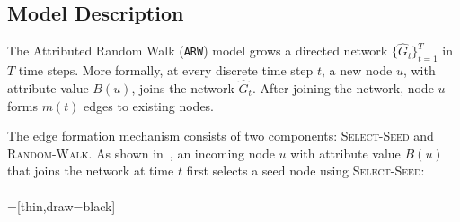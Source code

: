 \subsection{Model Description}
\label{sub:Model Description}
The Attributed Random Walk (\texttt{ARW}) model grows a directed network $\{\hat{G}_t\}^T_{t=1}$
in $T$ time steps.
More formally, at every discrete time step $t$, a
new node $u$, with attribute value $B(u)$, joins the network $\hat{G}_t$.
After joining the network, node $u$ forms $m(t)$ edges to
existing nodes.

The edge formation mechanism consists of two components: \textsc{Select-Seed} and
\textsc{Random-Walk}. As shown in~, an incoming node $u$ with attribute value $B(u)$ that joins the
network at time $t$ first selects a seed node using \textsc{Select-Seed}:
\\\\
=[thin,draw=black]


